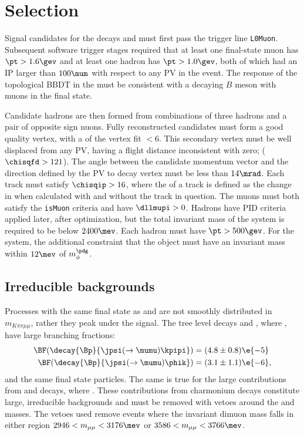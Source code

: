 \section{Selection}

Signal candidates for the decays \btokpipimumu and \btophikmumu must first pass the \lone trigger
line {\tt L0Muon}.
Subsequent software trigger stages required that at least one final-state muon has $\pt>1.6\gev$
and at least one hadron has $\pt>1.0\gev$, both of which had an IP larger than $100\mum$ with
respect to any PV in the event.
The response of the topological BBDT in the \hlttwo must be consistent with a decaying $B$ meson
with muons in the final state.


Candidate \Bp hadrons are then formed from combinations of three hadrons and a pair of opposite
sign nuons.
Fully reconstructed candidates must form a good quality vertex, with a \chisq of the vertex fit
$<6$.
This secondary vertex must be well displaced from any PV, having a flight distance inconsistent
with zero; ($\chisqfd>121$).
The angle between the \Bp candidate momentum vector and the direction defined by the PV to \Bp decay
vertex must be less than $14\mrad$.
Each track must satisfy $\chisqip>16$, where the \chisqip of a track is defined as the change in
\chisqip when calculated with and without the track in question.
The muons must both satisfy the {\tt isMuon} criteria and have $\dllmupi>0$.
Hadrons have PID criteria applied later, after optimization, but the total invariant mass of the
\kpipi system is required to be below $2400\mev$.
Each hadron must have $\pt>500\gev$.
For the \phik system, the additional constraint that the \decay{\phi}{\kk} object must have an
invariant mass within $12\mev$ of $m_\phi^\pdg$.



\subsection{Irreducible backgrounds}

Processes with the same final state as \btokpipimumu and \btophikmumu are not smoothly distributed
in $m_{K\pi\pi\mu\mu}$, rather they peak under the signal.
The tree level decays \decay{\Bp}{\jpsi\kpipi} and \decay{\Bp}{\jpsi\phik}, where
\decay{\jpsi}{\mumu}, have large branching fractions:
\begin{align}
  \BF(\decay{\Bp}{\jpsi(\to\mumu)\kpipi}) &= (4.8 \pm 0.8)\e{-5} \\
  \BF(\decay{\Bp}{\jpsi(\to\mumu)\phik}) &= (3.1 \pm 1.1)\e{-6},
\end{align}
and the same final state particles.
The same is true for the large contributions from \decay{\Bp}{\psitwos\kpipi} and
\decay{\Bp}{\psitwos\phik} decays, where \decay{\psitwos}{\mumu}.
These contributions from charmonium decays constitute large, irreducible backgrounds and must be
removed with vetoes around the \jpsi and \psitwos masses.
The vetoes used remove events where the invariant dimuon mass falls in either region
$2946<m_{\mu\mu}<3176\mev$ or $3586<m_{\mu\mu}<3766\mev$.

